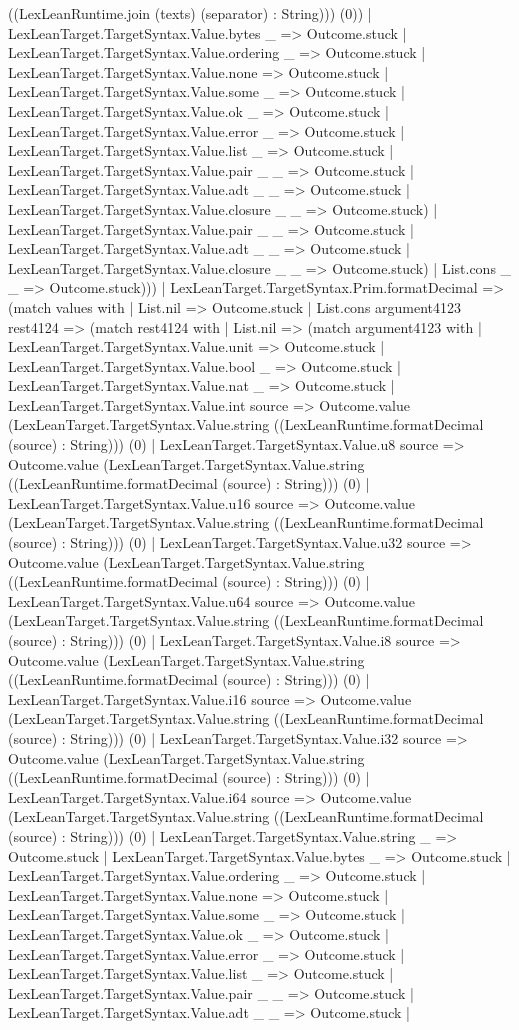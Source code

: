 \documentclass[11pt]{article}
\begin{document}
((LexLeanRuntime.join (texts) (separator) : String))) (0)) | LexLeanTarget.TargetSyntax.Value.bytes \_ => Outcome.stuck | LexLeanTarget.TargetSyntax.Value.ordering \_ => Outcome.stuck | LexLeanTarget.TargetSyntax.Value.none => Outcome.stuck | LexLeanTarget.TargetSyntax.Value.some \_ => Outcome.stuck | LexLeanTarget.TargetSyntax.Value.ok \_ => Outcome.stuck | LexLeanTarget.TargetSyntax.Value.error \_ => Outcome.stuck | LexLeanTarget.TargetSyntax.Value.list \_ => Outcome.stuck | LexLeanTarget.TargetSyntax.Value.pair \_ \_ => Outcome.stuck | LexLeanTarget.TargetSyntax.Value.adt \_ \_ => Outcome.stuck | LexLeanTarget.TargetSyntax.Value.closure \_ \_ => Outcome.stuck) | LexLeanTarget.TargetSyntax.Value.pair \_ \_ => Outcome.stuck | LexLeanTarget.TargetSyntax.Value.adt \_ \_ => Outcome.stuck | LexLeanTarget.TargetSyntax.Value.closure \_ \_ => Outcome.stuck) | List.cons \_ \_ => Outcome.stuck))) | LexLeanTarget.TargetSyntax.Prim.formatDecimal => (match values with | List.nil => Outcome.stuck | List.cons argument4123 rest4124 => (match rest4124 with | List.nil => (match argument4123 with | LexLeanTarget.TargetSyntax.Value.unit => Outcome.stuck | LexLeanTarget.TargetSyntax.Value.bool \_ => Outcome.stuck | LexLeanTarget.TargetSyntax.Value.nat \_ => Outcome.stuck | LexLeanTarget.TargetSyntax.Value.int source => Outcome.value (LexLeanTarget.TargetSyntax.Value.string ((LexLeanRuntime.formatDecimal (source) : String))) (0) | LexLeanTarget.TargetSyntax.Value.u8 source => Outcome.value (LexLeanTarget.TargetSyntax.Value.string ((LexLeanRuntime.formatDecimal (source) : String))) (0) | LexLeanTarget.TargetSyntax.Value.u16 source => Outcome.value (LexLeanTarget.TargetSyntax.Value.string ((LexLeanRuntime.formatDecimal (source) : String))) (0) | LexLeanTarget.TargetSyntax.Value.u32 source => Outcome.value (LexLeanTarget.TargetSyntax.Value.string ((LexLeanRuntime.formatDecimal (source) : String))) (0) | LexLeanTarget.TargetSyntax.Value.u64 source => Outcome.value (LexLeanTarget.TargetSyntax.Value.string ((LexLeanRuntime.formatDecimal (source) : String))) (0) | LexLeanTarget.TargetSyntax.Value.i8 source => Outcome.value (LexLeanTarget.TargetSyntax.Value.string ((LexLeanRuntime.formatDecimal (source) : String))) (0) | LexLeanTarget.TargetSyntax.Value.i16 source => Outcome.value (LexLeanTarget.TargetSyntax.Value.string ((LexLeanRuntime.formatDecimal (source) : String))) (0) | LexLeanTarget.TargetSyntax.Value.i32 source => Outcome.value (LexLeanTarget.TargetSyntax.Value.string ((LexLeanRuntime.formatDecimal (source) : String))) (0) | LexLeanTarget.TargetSyntax.Value.i64 source => Outcome.value (LexLeanTarget.TargetSyntax.Value.string ((LexLeanRuntime.formatDecimal (source) : String))) (0) | LexLeanTarget.TargetSyntax.Value.string \_ => Outcome.stuck | LexLeanTarget.TargetSyntax.Value.bytes \_ => Outcome.stuck | LexLeanTarget.TargetSyntax.Value.ordering \_ => Outcome.stuck | LexLeanTarget.TargetSyntax.Value.none => Outcome.stuck | LexLeanTarget.TargetSyntax.Value.some \_ => Outcome.stuck | LexLeanTarget.TargetSyntax.Value.ok \_ => Outcome.stuck | LexLeanTarget.TargetSyntax.Value.error \_ => Outcome.stuck | LexLeanTarget.TargetSyntax.Value.list \_ => Outcome.stuck | LexLeanTarget.TargetSyntax.Value.pair \_ \_ => Outcome.stuck | LexLeanTarget.TargetSyntax.Value.adt \_ \_ => Outcome.stuck | 
\end{document}
